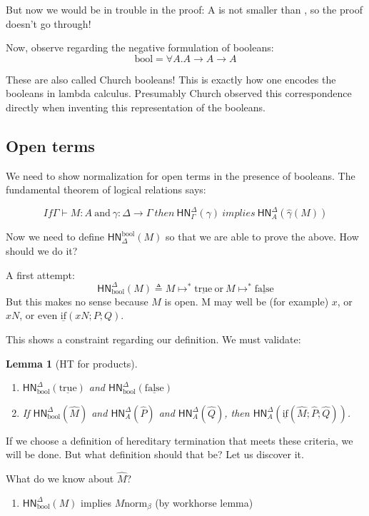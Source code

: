 \documentclass{article}
\newtheorem{lem}[thm]{Lemma}
\newcommand{\hasEF}[3]{\ensuremath{#1 \vdash #2 : #3}}
\newcommand{\bnorm}[1]{\ensuremath{#1 \mathrel{\text{norm}_\beta}}}
\newcommand{\hnorm}[3]{\ensuremath{\mathsf{HN}^{#1}_{#2}(#3)}}
\newcommand{\steps}[2]{\ensuremath{#1 \mapsto^* #2}}
\newcommand{\fn}[2]{\ensuremath{#1 \to #2}}
\newcommand{\booltype}{\text{bool}}
\newcommand{\true}{\ensuremath{\mathrm{\underline{true}}}}
\newcommand{\false}{\ensuremath{\mathrm{\underline{false}}}}
\newcommand{\ifexpr}[3]{\ensuremath{\mathrm{\underline{if}}(#1; #2; #3)}}
\begin{document}
But now we would be in trouble in the proof: A is not smaller than \booltype, so the proof doesn't go through!

Now, observe regarding the negative formulation of booleans:
\[
\booltype = \forall A . \fn{A}{\fn{A}{A}}
\]

These are also called Church booleans! This is exactly how one encodes the booleans in lambda calculus. Presumably Church observed this correspondence directly when inventing this representation of the booleans.

\subsection{Open terms}
We need to show normalization for open terms in the presence of booleans. The fundamental theorem of logical relations says:

\[
If \hasEF{\Gamma}{M}{A} \ \text{and} \ \gamma : \Delta \to \Gamma \ then \  \hnorm{\Delta}{\Gamma}{\gamma} \ implies \ \hnorm{\Delta}{A}{\hat\gamma(M)}
\]

Now we need to define \hnorm{\booltype}{\Delta}{M} so that we are able to prove the above. How should we do it?

A first attempt: 
\[
\hnorm{\Delta}{\booltype}{M} \triangleq \steps{M}{\true} \ \text{or} \ \steps{M}{\false}
\]
But this makes no sense because $M$ is open. M may well be (for example) $x$, or $x N$, or even $\ifexpr{x N}{P}{Q}$.

This shows a constraint regarding our definition. We must validate:
\begin{lem}[HT for products]
\leavevmode
\label{ht-prods}
\begin{enumerate}
\item \hnorm{\Delta}{\booltype}{\true} and \hnorm{\Delta}{\booltype}{\false}
\item If \hnorm{\Delta}{\booltype}{\hat M} and \hnorm{\Delta}{A}{\hat P} and \hnorm{\Delta}{A}{\hat Q}, then \hnorm{\Delta}{A}{\ifexpr{\hat M}{\hat P}{\hat Q}}.
\end{enumerate}
\end{lem}

If we choose a definition of hereditary termination that meets these criteria, we will be done. But what definition should that be? Let us discover it.

What do we know about $\hat M$?

\begin{enumerate}
\item \hnorm{\Delta}{\booltype}{M} implies \bnorm{M} (by workhorse lemma)
\end{enumerate}
\end{document}
